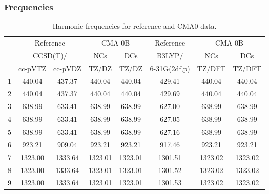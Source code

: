 \documentclass[10pt,oneside]{article}
\begin{document}
\subsubsection*{Frequencies}
\begin{table}[h!]
\centering
\caption{Harmonic frequencies for reference and CMA0 data.}
\begin{tabular}{cccccccc}
\toprule
{} & \multicolumn{2}{c}{Reference} & \multicolumn{2}{c}{CMA-0B} &    Reference & \multicolumn{2}{c}{CMA-0B} \\
{} & \multicolumn{2}{c}{CCSD(T)/} &     NCs &     DCs &       B3LYP/ &     NCs &     DCs \\
{} &   cc-pVTZ & cc-pVDZ &   TZ/DZ &   TZ/DZ & 6-31G(2df,p) &  TZ/DFT &  TZ/DFT \\
\midrule
1 &    440.04 &  437.37 &  440.04 &  440.04 &       429.41 &  440.04 &  440.04 \\
2 &    440.04 &  437.37 &  440.04 &  440.04 &       429.69 &  440.04 &  440.04 \\
3 &    638.99 &  633.41 &  638.99 &  638.99 &       627.00 &  638.99 &  638.99 \\
4 &    638.99 &  633.41 &  638.99 &  638.99 &       627.05 &  638.99 &  638.99 \\
5 &    638.99 &  633.41 &  638.99 &  638.99 &       627.16 &  638.99 &  638.99 \\
6 &    923.21 &  909.04 &  923.21 &  923.21 &       917.46 &  923.21 &  923.21 \\
7 &   1323.00 & 1333.64 & 1323.01 & 1323.01 &      1301.51 & 1323.02 & 1323.02 \\
8 &   1323.00 & 1333.64 & 1323.01 & 1323.01 &      1301.52 & 1323.02 & 1323.02 \\
9 &   1323.00 & 1333.64 & 1323.01 & 1323.01 &      1301.53 & 1323.02 & 1323.02 \\
\bottomrule
\end{tabular}
\end{table}

\clearpage
\end{document}
